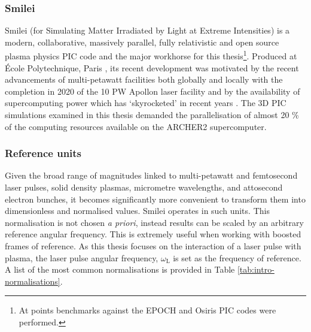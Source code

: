 \subsubsection{Smilei}
Smilei (for Simulating Matter Irradiated by Light at Extreme Intensities) is a modern, collaborative, massively parallel, fully relativistic and open source plasma physics PIC code and the major workhorse for this thesis\footnote{At points benchmarks against the EPOCH and Osiris PIC codes were performed.}. 
Produced at École Polytechnique, Paris \cite{derouillatSmileiCollaborativeOpensource2018}, its recent development was motivated by the recent advancements of multi-petawatt facilities both globally and locally with the completion in 2020 of the 10 PW Apollon laser facility and by the availability of supercomputing power which has `skyrocketed' in recent years \cite{derouillatSmileiCollaborativeOpensource2018}. The 3D \ac{PIC} simulations examined in this thesis demanded the parallelisation of almost 20 \% of the computing resources available on the ARCHER2 supercomputer.

\subsubsection{Reference units}
Given the broad range of magnitudes linked to multi-petawatt and femtosecond laser pulses, solid density plasmas, micrometre wavelengths, and attosecond electron bunches, it becomes significantly more convenient to transform them into dimensionless and normalised values. Smilei operates in such units. This normalisation is not chosen \textit{a priori}, instead results can be scaled by an arbitrary reference angular frequency. This is extremely useful when working with boosted frames of reference. As this thesis focuses on the interaction of a laser pulse with plasma, the laser pulse angular frequency, $\omega_\mathrm{L}$ is set as the frequency of reference. A list of the most common normalisations is provided in Table \ref{tab:intro-normalisations}.

